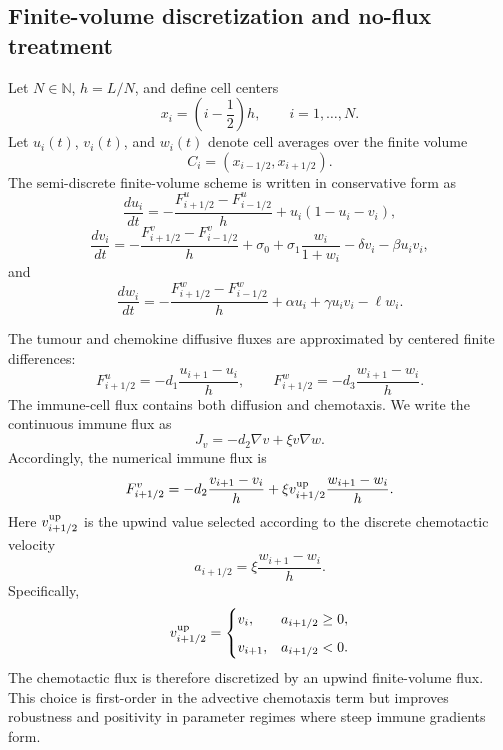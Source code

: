\documentclass[a4paper,fleqn,longmktitle]{cas-sc}
\theoremstyle{plain}
\theoremstyle{definition}
\numberwithin{equation}{section}
\begin{document}
\subsection{Finite-volume discretization and no-flux treatment}
\label{subsec:finite-volume-discretization}

Let \(N\in\mathbb N\), \(h=L/N\), and define cell centers
\[
x_i=\left(i-\frac12\right)h,\qquad i=1,\dots,N.
\]
Let \(u_i(t)\), \(v_i(t)\), and \(w_i(t)\) denote cell averages over the finite
volume
\[
C_i=(x_{i-1/2},x_{i+1/2}).
\]
The semi-discrete finite-volume scheme is written in conservative form as
\begin{equation}\label{eq:fv-semidiscrete-u}
\frac{d u_i}{dt}
=
-\frac{F^u_{i+1/2}-F^u_{i-1/2}}{h}
+
u_i(1-u_i-v_i),
\end{equation}
\begin{equation}\label{eq:fv-semidiscrete-v}
\frac{d v_i}{dt}
=
-\frac{F^v_{i+1/2}-F^v_{i-1/2}}{h}
+
\sigma_0+\sigma_1\frac{w_i}{1+w_i}
-\delta v_i-\beta u_i v_i,
\end{equation}
and
\begin{equation}\label{eq:fv-semidiscrete-w}
\frac{d w_i}{dt}
=
-\frac{F^w_{i+1/2}-F^w_{i-1/2}}{h}
+
\alpha u_i+\gamma u_i v_i-\ell w_i .
\end{equation}

The tumour and chemokine diffusive fluxes are approximated by centered finite
differences:
\begin{equation}\label{eq:u-w-fluxes}
F^u_{i+1/2}
=
-d_1\frac{u_{i+1}-u_i}{h},
\qquad
F^w_{i+1/2}
=
-d_3\frac{w_{i+1}-w_i}{h}.
\end{equation}
The immune-cell flux contains both diffusion and chemotaxis. We write the
continuous immune flux as
\[
J_v=-d_2\nabla v+\xi v\nabla w .
\]
Accordingly, the numerical immune flux is
\begin{equation}\label{eq:v-flux}
F^v_{i+1/2}
=
-d_2\frac{v_{i+1}-v_i}{h}
+
\xi v^{\rm up}_{i+1/2}\frac{w_{i+1}-w_i}{h}.
\end{equation}
Here \(v^{\rm up}_{i+1/2}\) is the upwind value selected according to the
discrete chemotactic velocity
\[
a_{i+1/2}
=
\xi\frac{w_{i+1}-w_i}{h}.
\]
Specifically,
\begin{equation}\label{eq:upwind-value}
v^{\rm up}_{i+1/2}
=
\begin{cases}
v_i, & a_{i+1/2}\ge0,\\[2mm]
v_{i+1}, & a_{i+1/2}<0.
\end{cases}
\end{equation}
The chemotactic flux is therefore discretized by an upwind finite-volume flux.
This choice is first-order in the advective chemotaxis term but improves
robustness and positivity in parameter regimes where steep immune gradients
form.
\end{document}
